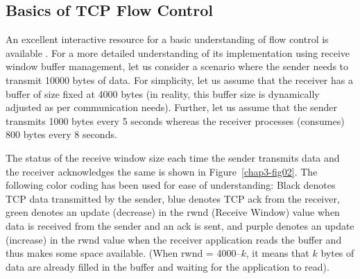 \begin{multicols}{2}
\section{Basics of TCP Flow Control}

An excellent interactive resource for a basic understanding of flow control is available \cite{art3-key07}. For a more detailed understanding of its implementation using receive window buffer management, let us consider a scenario where the sender needs to transmit 10000 bytes of data. For simplicity, let us assume that the receiver has a buffer of size fixed at 4000 bytes (in reality, this buffer size is dynamically adjusted as per communication needs). Further, let us assume that the sender transmits 1000 bytes every 5 seconds whereas the receiver processes (consumes) 800 bytes every 8 seconds.

The status of the receive window size each time the sender transmits data and the receiver acknowledges the same is shown in Figure~\ref{chap3-fig02}. The following color coding has been used for ease of understanding: Black denotes TCP data transmitted by the sender, blue denotes TCP ack from the receiver, green denotes an update (decrease) in the rwnd (Receive Window) value when data is received from the sender and an ack is sent, and purple denotes an update (increase) in the rwnd value when the receiver application reads the buffer and thus makes some space available. (When rwnd = 4000–$k$, it means that $k$ bytes of data are already filled in the buffer and waiting for the application to read).


\end{multicols}
